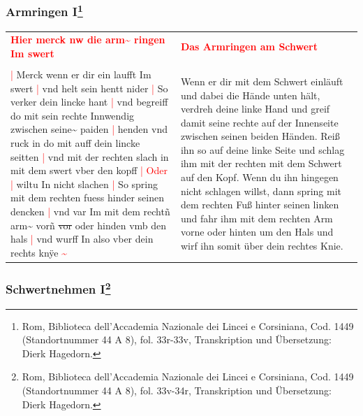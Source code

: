 \newpage

\subsubsection[Armringen I]{
    Armringen I\footnote{
        \hspace*{0.5ex}Rom, Biblioteca dell'Accademia Nazionale dei Lincei e Corsiniana,
        Cod. 1449 (Standortnummer 44 A 8), fol. 33r-33v, Transkription und Übersetzung: Dierk Hagedorn.}}

\begin{longtable}{p{6.25cm}p{6.25cm}}
    \textbf{\textcolor{red}{
        Hier merck nw die arm\textasciitilde{} ringen Im swert}}
    &
    \textbf{\textcolor{red}{
        Das Armringen am Schwert}}
    \\
    \\
    \textcolor{red}{|} Merck wenn er dir ein laufft Im swert
    \textcolor{red}{|} vnd helt sein hentt nider
    \textcolor{red}{|} So verker dein lincke hant
    \textcolor{red}{|} vnd begreiff do mit sein rechte Innwendig zwischen seine\textasciitilde{} paiden
    \textcolor{red}{|} henden vnd ruck in do mit auff dein lincke seitten
    \textcolor{red}{|} vnd mit der rechten slach in mit dem swert vber den kopff
    \textcolor{red}{|} \textcolor{red}{Oder}
    \textcolor{red}{|} wiltu In nicht slachen
    \textcolor{red}{|} So spring mit dem rechten fuess hinder seinen dencken
    \textcolor{red}{|} vnd var Im mit dem rechtñ arm\textasciitilde{} vorñ \st{vor} oder hinden vmb den hals
    \textcolor{red}{|} vnd wurff In also vber dein rechts knÿe \textcolor{red}{\textasciitilde{}}
    &
    Wenn er dir mit dem Schwert einläuft und dabei die Hände unten hält, verdreh deine linke Hand und greif damit seine rechte auf der Innenseite zwischen seinen beiden Händen.
    Reiß ihn so auf deine linke Seite und schlag ihm mit der rechten mit dem Schwert auf den Kopf.
    Wenn du ihn hingegen nicht schlagen willst, dann spring mit dem rechten Fuß hinter seinen linken und fahr ihm mit dem rechten Arm vorne oder hinten um den Hals und wirf ihn somit über dein rechtes Knie.
\end{longtable}

\newpage

\begin{center}
\end{center}

\newpage

\subsubsection[Schwertnehmen I]{
    Schwertnehmen I\footnote{
        \hspace*{0.5ex}Rom, Biblioteca dell'Accademia Nazionale dei Lincei e Corsiniana,
        Cod. 1449 (Standortnummer 44 A 8), fol. 33v-34r, Transkription und Übersetzung: Dierk Hagedorn.}}

